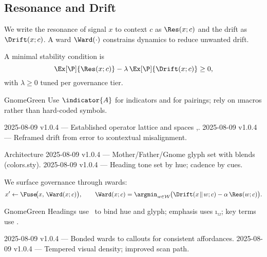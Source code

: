 \subsection*{Resonance and Drift}
We write the resonance of signal $x$ to context $c$ as $\Res(x;c)$ and the drift as $\Drift(x;c)$. A ward $\Ward(\cdot)$ constrains dynamics to reduce unwanted drift.

A minimal stability condition is
\[
\Ex[\P]{\Res(x;c)} - \lambda\,\Ex[\P]{\Drift(x;c)} \ge 0,
\]
with $\lambda \ge 0$ tuned per governance tier.

\begin{callout}[Notation]{GnomeGreen}
Use $\indicator{A}$ for indicators and \ip*{\,\cdot\,}{\,\cdot\,} for pairings; rely on \i{macros} rather than hard-coded symbols.
\end{callout}

\begin{SectionFooterLedger}
 2025-08-09 v1.0.4 — Established operator lattice and spaces \Man,\Core.
  2025-08-09 v1.0.4 — Reframed drift from error to \i{contextual misalignment}.
\end{SectionFooterLedger}



\begin{SectionHeaderLedger}{Architecture}
 2025-08-09 v1.0.4 — Mother/Father/Gnome glyph set with blends (colors.sty).
  2025-08-09 v1.0.4 — Heading tone set by hue; cadence by \VoicePara{} cues.
\end{SectionHeaderLedger}

We surface governance through \i{wards}:
\[
x' \gets \Fuse\!\big(x,\, \Ward(x;c)\big), \qquad
\Ward(x;c) = \argmin_{w \in \mathcal{W}} \big( \Drift(x\! \parallel\! w;c) - \alpha\,\Res(w;c) \big).
\]

\begin{callout}{GnomeGreen}
Headings use \Section\ to bind hue and glyph; emphasis uses \i,\b,\ib; key terms use \key.
\end{callout}

\begin{SectionFooterLedger}
  2025-08-09 v1.0.4 — Bonded wards to callouts for consistent affordances.
 2025-08-09 v1.0.4 — Tempered visual density; improved scan path.
\end{SectionFooterLedger}


